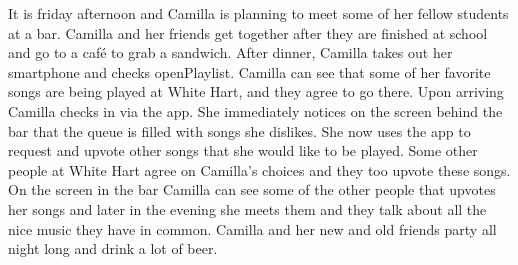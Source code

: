 It is friday afternoon and Camilla is planning to meet some of her fellow students at a bar. Camilla and her friends get together after they are finished at school and go to a café to grab a sandwich. After dinner, Camilla takes out her smartphone and checks openPlaylist. Camilla can see that some of her favorite songs are being played at White Hart, and they agree to go there. Upon arriving Camilla checks in via the app. She immediately notices on the screen behind the bar that the queue is filled with songs she dislikes. She now uses the app to request and upvote other songs that she would like to be played. Some other people at White Hart agree on Camilla's choices and they too upvote these songs. On the screen in the bar Camilla can see some of the other people that upvotes her songs and later in the evening she meets them and they talk about all the nice music they have in common. Camilla and her new and old friends party all night long and drink a lot of beer.
